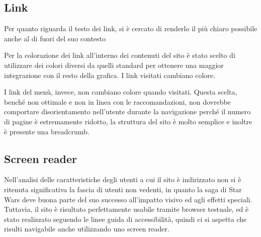 \subsection{Link}
Per quanto riguarda il testo dei link, si è cercato di renderlo il più chiaro possibile anche al di fuori del suo contesto

Per la colorazione dei link all'interno dei contenuti del sito è stato scelto di utilizzare dei colori diversi da quelli standard per ottenere una maggior integrazione con il resto della grafica. I link visitati cambiano colore.

I link del menù, invece, non cambiano colore quando visitati. Questa scelta, benché non ottimale e non in linea con le raccomandazioni, non dovrebbe comportare disorientamento nell'utente durante la navigazione perché il numero di pagine è estremamente ridotto, la struttura del sito è molto semplice e inoltre è presente una breadcrumb.

\subsection{Screen reader}
Nell'analisi delle caratteristiche degli utenti a cui il sito è indirizzato non si è ritenuta significativa la fascia di utenti non vedenti, in quanto la saga di Star Wars deve buona parte del suo successo all'impatto visivo ed agli effetti speciali. \newline
Tuttavia, il sito è risultato perfettamente usabile tramite browser testuale, ed è stato realizzato seguendo le linee guida di accessibilità, quindi ci si aspetta che risulti navigabile anche utilizzando uno screen reader.
